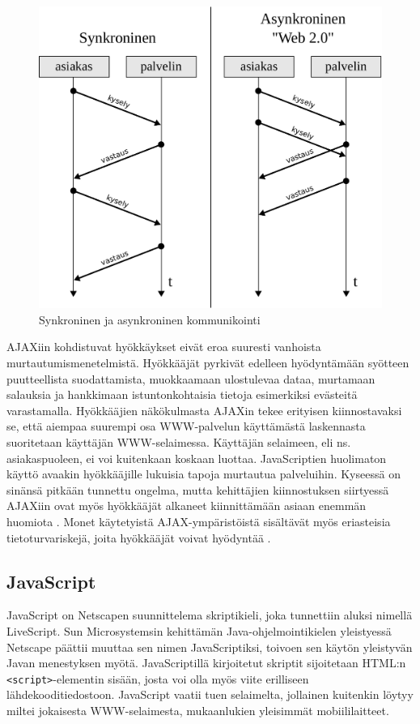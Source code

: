 \begin{figure}[htp]
\centering
\includegraphics[width=12cm]{pics/synkroninen.pdf}
\caption{Synkroninen ja asynkroninen kommunikointi}
\label{synkroninen}
\end{figure}

AJAXiin kohdistuvat hyökkäykset eivät eroa suuresti vanhoista murtautumismenetelmistä. Hyökkääjät pyrkivät edelleen hyödyntämään syötteen puutteellista suodattamista, muokkaamaan 
ulostulevaa dataa, murtamaan salauksia ja hankkimaan istuntonkohtaisia tietoja esimerkiksi evästeitä varastamalla. Hyökkääjien näkökulmasta AJAXin tekee erityisen kiinnostavaksi se,
että aiempaa suurempi osa WWW-palvelun käyttämästä laskennasta suoritetaan käyttäjän WWW-selaimessa. Käyttäjän selaimeen, eli ns. asiakaspuoleen, ei voi kuitenkaan koskaan luottaa.
JavaScriptien huolimaton käyttö avaakin hyökkääjille lukuisia tapoja murtautua palveluihin. Kyseessä on sinänsä pitkään tunnettu ongelma, mutta kehittäjien kiinnostuksen siirtyessä 
AJAXiin ovat myös hyökkääjät alkaneet kiinnittämään asiaan enemmän huomiota \cite{AJAX}. Monet käytetyistä AJAX-ympäristöistä sisältävät myös eriasteisia tietoturvariskejä, joita 
hyökkääjät voivat hyödyntää \cite{JSH}.

\subsection{JavaScript}

JavaScript on Netscapen suunnittelema skriptikieli, joka tunnettiin aluksi nimellä LiveScript. Sun Microsystemsin kehittämän Java-ohjelmointikielen yleistyessä Netscape päättii muuttaa
sen nimen JavaScriptiksi, toivoen sen käytön yleistyvän Javan menestyksen myötä. JavaScriptillä kirjoitetut skriptit sijoitetaan HTML:n \texttt{<script>}-elementin sisään, josta voi 
olla myös viite erilliseen lähdekooditiedostoon. JavaScript vaatii tuen selaimelta, jollainen kuitenkin löytyy miltei jokaisesta WWW-se\-lai\-mes\-ta, mukaanlukien yleisimmät mobiililaitteet.

